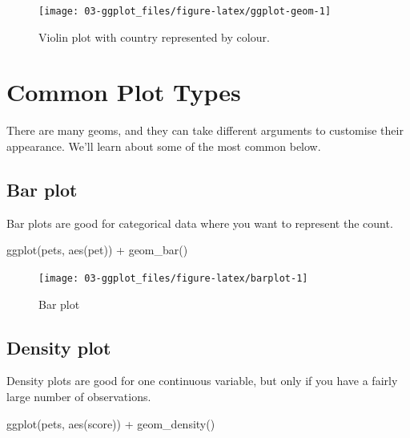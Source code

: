 \documentclass[
  oneside]{book}
\newenvironment{Shaded}{\begin{snugshade}}{\end{snugshade}}
\newcommand{\FunctionTok}[1]{\textcolor[rgb]{0.00,0.00,0.00}{#1}}
\newcommand{\NormalTok}[1]{#1}
\newcommand{\SpecialCharTok}[1]{\textcolor[rgb]{0.00,0.00,0.00}{#1}}
\begin{document}
\begin{figure}

{\centering \texttt{[image: 03-ggplot\_files/figure-latex/ggplot-geom-1]} 

}

\caption{Violin plot with country represented by colour.}\label{fig:ggplot-geom}
\end{figure}

\hypertarget{common-plot-types}{%
\section{Common Plot Types}\label{common-plot-types}}

There are many geoms, and they can take different arguments to customise their appearance. We'll learn about some of the most common below.

\hypertarget{geom_bar}{%
\subsection{Bar plot}\label{geom_bar}}

Bar plots are good for categorical data where you want to represent the count.

\begin{Shaded}
\begin{Highlighting}[]
\FunctionTok{ggplot}\NormalTok{(pets, }\FunctionTok{aes}\NormalTok{(pet)) }\SpecialCharTok{+}
  \FunctionTok{geom\_bar}\NormalTok{()}
\end{Highlighting}
\end{Shaded}

\begin{figure}

{\centering \texttt{[image: 03-ggplot\_files/figure-latex/barplot-1]} 

}

\caption{Bar plot}\label{fig:barplot}
\end{figure}

\hypertarget{geom_density}{%
\subsection{Density plot}\label{geom_density}}

Density plots are good for one continuous variable, but only if you have a fairly large number of observations.

\begin{Shaded}
\begin{Highlighting}[]
\FunctionTok{ggplot}\NormalTok{(pets, }\FunctionTok{aes}\NormalTok{(score)) }\SpecialCharTok{+}
  \FunctionTok{geom\_density}\NormalTok{()}
\end{Highlighting}
\end{Shaded}
\end{document}
